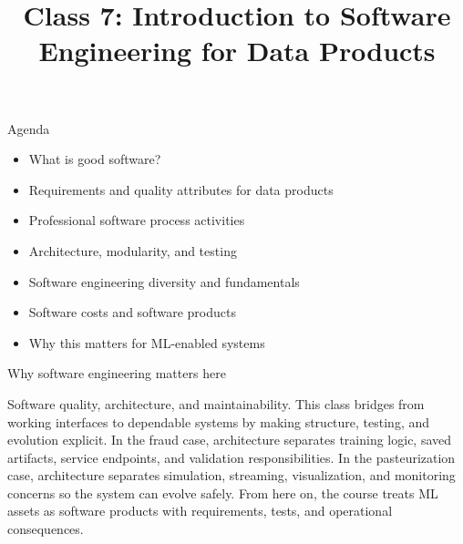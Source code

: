 

\title{Class 7: Introduction to Software Engineering for Data Products}
\author{\coursename}
\date{}



\frame{\titlepage \coursefooter}

\begin{frame}{Agenda}
\begin{itemize}
\item What is good software?
\item Requirements and quality attributes for data products
\item Professional software process activities
\item Architecture, modularity, and testing
\item Software engineering diversity and fundamentals
\item Software costs and software products
\item Why this matters for ML-enabled systems
\end{itemize}
\coursefooter
\end{frame}

\begin{frame}{Why software engineering matters here}
\coursefooter
\end{frame}

\coursecontextframe
{Software quality, architecture, and maintainability.}
{This class bridges from working interfaces to dependable systems by making structure, testing, and evolution explicit.}
{In the fraud case, architecture separates training logic, saved artifacts, service endpoints, and validation responsibilities.}
{In the pasteurization case, architecture separates simulation, streaming, visualization, and monitoring concerns so the system can evolve safely.}
{From here on, the course treats ML assets as software products with requirements, tests, and operational consequences.}

